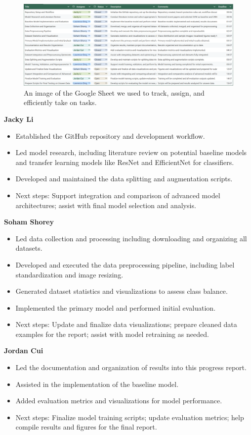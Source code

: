 \documentclass{article} %
\begin{document}
\begin{figure}[h]
\begin{center}
\includegraphics[width=1.0\textwidth]{Figs/google_sheet_tracking.png}
\end{center}
\caption{An image of the Google Sheet we used to track, assign, and efficiently take on tasks.}
\end{figure}


\textbf{Jacky Li}
\begin{itemize}
\item Established the GitHub repository and development workflow.
\item Led model research, including literature review on potential baseline models and transfer learning models like ResNet and EfficientNet for classifiers.
\item Developed and maintained the data splitting and augmentation scripts.
\item Next steps: Support integration and comparison of advanced model architectures; assist with final model selection and analysis.
\end{itemize}

\textbf{Soham Shorey}
\begin{itemize}
\item Led data collection and processing including downloading and organizing all datasets.
\item Developed and executed the data preprocessing pipeline, including label standardization and image resizing.
\item Generated dataset statistics and visualizations to assess class balance.
\item Implemented the primary model and performed initial evaluation.
\item Next steps: Update and finalize data visualizations; prepare cleaned data examples for the report; assist with model retraining as needed.
\end{itemize}

\textbf{Jordan Cui}
\begin{itemize}
\item Led the documentation and organization of results into this progress report.
\item Assisted in the implementation of the baseline model.
\item Added evaluation metrics and visualizations for model performance.
\item Next steps: Finalize model training scripts; update evaluation metrics; help compile results and figures for the final report.
\end{itemize}
\end{document}

